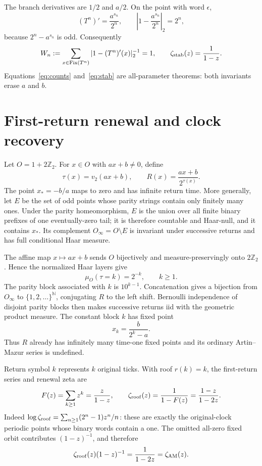 \documentclass[10pt]{article}
\newcommand{\Ztwo}{\mathbb Z_2}
\newcommand{\Fix}{\operatorname{Fix}}
\newcommand{\val}{v_2}
\begin{document}
The branch derivatives are $1/2$ and $a/2$.  On the point with word
$\epsilon$,
\[
(T^n)'=\frac{a^{s_n}}{2^n},\qquad
\left|1-\frac{a^{s_n}}{2^n}\right|_2=2^n,
\]
because $2^n-a^{s_n}$ is odd.  Consequently
\begin{equation}\label{eq:stab}
W_n:=\sum_{x\in\Fix(T^n)}|1-(T^n)'(x)|_2^{-1}=1,
\qquad \zeta_{\rm stab}(z)=\frac1{1-z}.
\end{equation}
Equations~\eqref{eq:counts} and~\eqref{eq:stab} are all-parameter theorems:
both invariants erase $a$ and $b$.

\section{First-return renewal and clock recovery}
Let $O=1+2\Ztwo$.  For $x\in O$ with $ax+b\ne0$, define
\begin{equation}\label{eq:return}
\tau(x)=\val(ax+b),\qquad R(x)=\frac{ax+b}{2^{\tau(x)}}.
\end{equation}
The point $x_*=-b/a$ maps to zero and has infinite return time.  More
generally, let $E$ be the set of odd points whose parity strings contain
only finitely many ones.  Under the parity homeomorphism, $E$ is the union
over all finite binary prefixes of one eventually-zero tail; it is therefore
countable and Haar-null, and it contains $x_*$.  Its complement
$O_\infty=O\setminus E$ is invariant under successive returns and has full
conditional Haar measure.

The affine map $x\mapsto ax+b$ sends $O$ bijectively and
measure-preservingly onto $2\Ztwo$.  Hence the normalized Haar layers give
\begin{equation}\label{eq:law}
\mu_O(\tau=k)=2^{-k},\qquad k\ge1.
\end{equation}
The parity block associated with $k$ is $10^{k-1}$.  Concatenation gives a
bijection from $O_\infty$ to $\{1,2,\ldots\}^{\mathbb N}$, conjugating $R$
to the left shift.  Bernoulli independence of disjoint parity blocks then
makes successive returns iid with the geometric product measure.  The
constant block $k$ has fixed point
\begin{equation}\label{eq:returnfixed}
x_k=\frac b{2^k-a}.
\end{equation}
Thus $R$ already has infinitely many time-one fixed points and its ordinary
Artin--Mazur series is undefined.

Return symbol $k$ represents $k$ original ticks.  With roof $r(k)=k$, the
first-return series and renewal zeta are
\begin{equation}\label{eq:roof}
F(z)=\sum_{k\ge1}z^k=\frac z{1-z},\qquad
\zeta_{\rm roof}(z)=\frac1{1-F(z)}=\frac{1-z}{1-2z}.
\end{equation}
Indeed
$\log\zeta_{\rm roof}=\sum_{n\ge1}(2^n-1)z^n/n$: these are exactly the
original-clock periodic points whose binary words contain a one.  The
omitted all-zero fixed orbit contributes $(1-z)^{-1}$, and therefore
\begin{equation}\label{eq:recovery}
\zeta_{\rm roof}(z)(1-z)^{-1}=\frac1{1-2z}=\zeta_{\rm AM}(z).
\end{equation}
\end{document}

